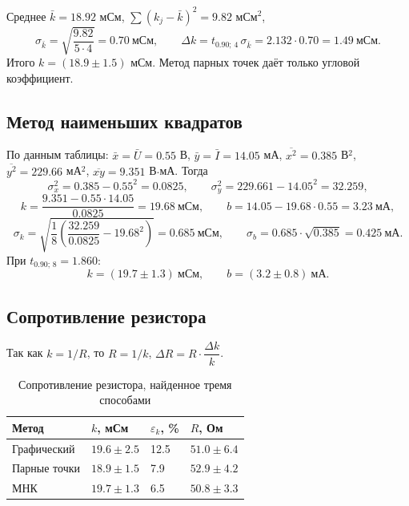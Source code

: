 \documentclass[12pt]{article}
\begin{document}
    Среднее $\bar k = 18.92$ мСм, $\sum (k_j - \bar k)^2 = 9.82$ мСм$^2$,
    \[
    	\sigma_{\bar k} = \sqrt{\frac{9.82}{5 \cdot 4}} = 0.70 \ \text{мСм}, \qquad
    	\varDelta k = t_{0.90;\,4}\,\sigma_{\bar k} = 2.132 \cdot 0.70 = 1.49 \ \text{мСм}.
    \]
    Итого $k = (18.9 \pm 1.5)$ мСм. Метод парных точек даёт только угловой коэффициент.

    \subsection{Метод наименьших квадратов}

    По данным таблицы: $\bar x = \bar U = 0.55$ В, $\bar y = \bar I = 14.05$ мА, $\overline{x^2} = 0.385$ В$^2$, $\overline{y^2} = 229.66$ мА$^2$, $\overline{xy} = 9.351$ В$\cdot$мА. Тогда
    \[
    	\sigma_x^2 = 0.385 - 0.55^2 = 0.0825, \qquad \sigma_y^2 = 229.661 - 14.05^2 = 32.259,
    \]
    \[
    	k = \frac{9.351 - 0.55 \cdot 14.05}{0.0825} = 19.68 \ \text{мСм}, \qquad
    	b = 14.05 - 19.68 \cdot 0.55 = 3.23 \ \text{мА},
    \]
    \[
    	\sigma_k = \sqrt{\frac{1}{8}\left(\frac{32.259}{0.0825} - 19.68^2\right)} = 0.685 \ \text{мСм}, \qquad
    	\sigma_b = 0.685 \cdot \sqrt{0.385} = 0.425 \ \text{мА}.
    \]
    При $t_{0.90;\,8} = 1.860$:
    \[
    	k = (19.7 \pm 1.3) \ \text{мСм}, \qquad b = (3.2 \pm 0.8) \ \text{мА}.
    \]

    \subsection{Сопротивление резистора}

    Так как $k = 1/R$, то $R = 1/k$, $\varDelta R = R \cdot \dfrac{\varDelta k}{k}$.

    \begin{table}[H]
        \centering
        \begin{xltabular}{\textwidth}{@{}XXXX@{}}
            \toprule
            Метод & $k$, мСм & $\varepsilon_k$, \% & $R$, Ом\\
            \midrule
            Графический       & $19.6 \pm 2.5$ & 12.5 & $51.0 \pm 6.4$ \\
            Парные точки      & $18.9 \pm 1.5$ & 7.9  & $52.9 \pm 4.2$ \\
            МНК               & $19.7 \pm 1.3$ & 6.5  & $50.8 \pm 3.3$ \\
            \bottomrule
        \end{xltabular}
        \caption{Сопротивление резистора, найденное тремя способами}
        \label{tab:R}
    \end{table}
\end{document}
